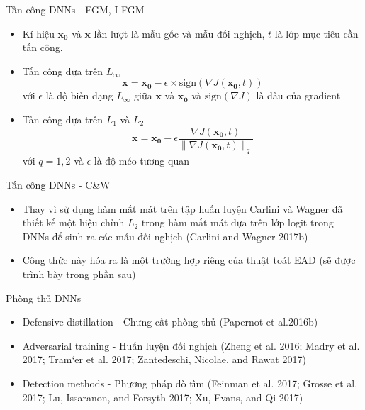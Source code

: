 \begin{frame}{Tấn công DNNs - FGM, I-FGM}
    \begin{itemize}
        \item Kí hiệu $\mathbf{x_0}$ và $\mathbf{x}$ lần lượt là mẫu gốc và mẫu đối nghịch,
        $t$ là lớp mục tiêu cần tấn công.

        \item Tấn công dựa trên $L_{\infty}$
        \begin{equation}
            \mathbf{x} = \mathbf{x_0} - \epsilon \times \text{sign}(\nabla J(\mathbf{x_0}, t))
        \end{equation}
        với $\epsilon$ là độ biến dạng $L_{\infty}$ giữa $\mathbf{x}$ và $\mathbf{x_0}$ và 
        $\text{sign}(\nabla J)$ là dấu của gradient
        
        \item Tấn công dựa trên $L_1$ và $L_2$
        \begin{equation}
            \mathbf{x} = \mathbf{x_0} - \epsilon \frac{\nabla J(\mathbf{x_0}, t)}
            {\lVert \nabla J(\mathbf{x_0}, t) \rVert _q}
        \end{equation}
        với $q = 1,2$ và $\epsilon$ là độ méo tương quan
    \end{itemize}
\end{frame}

\begin{frame}{Tấn công DNNs - C\&W}
    \begin{itemize}
        \item Thay vì sử dụng hàm mất mát trên tập huấn luyện Carlini và Wagner
        đã thiết kế  một hiệu chỉnh $L_2$ trong hàm mất mát dựa trên lớp logit trong DNNs để sinh 
        ra các mẫu đối nghịch (Carlini and Wagner 2017b)
        \item Công thức này hóa ra là một trường hợp riêng của thuật toát EAD (sẽ được trình bày trong phần sau)
    \end{itemize}
\end{frame}

\begin{frame}{Phòng thủ DNNs}
    \begin{itemize}
        \item Defensive distillation - Chưng cất phòng thủ (Papernot et al.2016b)
        \item Adversarial training - Huấn luyện đối nghịch (Zheng et al. 2016; Madry et al. 2017; 
        Tram`er et al. 2017; Zantedeschi, Nicolae, and Rawat 2017)
        \item Detection methods - Phương pháp dò tìm (Feinman et al. 2017; Grosse et al. 2017; Lu, Issaranon, and Forsyth 2017; 
        Xu, Evans, and Qi 2017)
    \end{itemize}
\end{frame}
